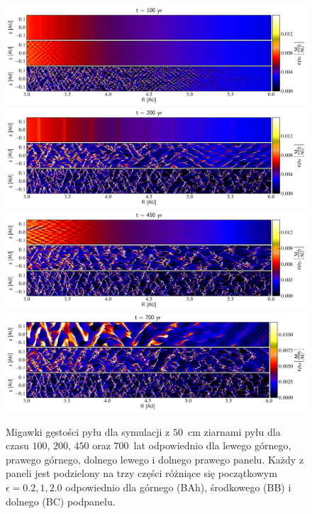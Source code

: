 \begin{figure}
   \centering
   \includegraphics[width=0.99\linewidth]{figures/fig1a}
   \includegraphics[width=0.99\linewidth]{figures/fig1b}
   \includegraphics[width=0.99\linewidth]{figures/fig1c}
   \includegraphics[width=0.99\linewidth]{figures/fig1d}
   \caption{Migawki gęstości pyłu dla symulacji z $50$~cm ziarnami pyłu
      dla czasu $100$, $200$, $450$ oraz $700$~lat odpowiednio dla lewego
      górnego, prawego górnego, dolnego lewego i dolnego prawego panelu.
      Każdy z paneli jest podzielony na trzy części różniące się początkowym 
      $\epsilon = 0.2, 1, 2.0$ odpowiednio dla górnego (BAh), środkowego (BB) i
      dolnego (BC) podpanelu.}
   \label{fig1}
\end{figure}
